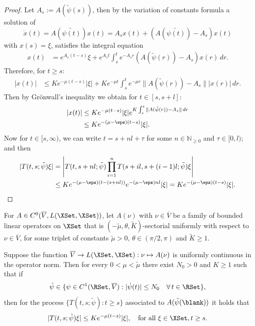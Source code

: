 \documentclass[a4paper]{siamart190516}
\begin{document}
 \begin{proof}
Let $A_s := A(\tilde{\psi}(s))$, then by the variation of constants formula a solution of
\[
\dot{x}(t) = A(\tilde{\psi(t)}) x(t) = A_s x(t) + (A(\tilde{\psi(t)}) - A_s) x(t)
\]
with $x(s) = \xi$, satisfies the integral equation
\begin{align*}
x(t) &= e^{A_s (t-s)} \xi + e^{A_s t} \int_s^t e^{-A_s r} ( A(\tilde{\psi}(r)) - A_s ) x(r) \, dr.
\end{align*}
Therefore, for $t \geq s$:
\begin{align*}
| x(t) | &\leq K e^{-\mu (t-s)} |\xi| + K e^{-\mu t} \int_s^t e^{-\mu r} \| A(\tilde{\psi}(r)) - A_s \| |  x(r) | \, dr.
\end{align*}
Then by Gr\"onwall's inequality we obtain for $t \in [s,s+l]$:
\begin{align*}
| x(t) | &\leq K e^{-\mu (t-s)} |\xi| e^{K \int_s^t \| A(\tilde{\psi}(r)) - A_s \|  \, dr} \\
&\leq K e^{-(\mu - \eps) (t-s) } |\xi|.
\end{align*}
Now for $t \in [s,\infty)$, we can write $t = s + n l + \tau$ for some $n \in \mathbb{N}_{\geq 0}$ and $\tau \in [0,l)$; and then
\begin{align*}
| T(t,s; \tilde{\psi}) \xi | &= \left| T(t, s+ nl; \tilde{\psi}) \prod_{i = 1}^{n} T(s+il, s+(i-1)l; \tilde{\psi}) \xi \right| \\
&\leq K e^{-(\mu - \eps) (t-(s+nl)) } e^{-(\mu - \eps) nl }  |\xi| = K e^{-(\mu - \eps) (t-s)}  |\xi|.
\end{align*}
\end{proof}

\begin{corollary}\label{cor:slow-A-stable}
For $A \in C^0(\overline{V},L(\XSet,\XSet))$, let $A(\nu)$ with $\nu \in \overline{V}$ be a family of bounded linear operators on $\XSet$ 
that is $(-\tilde{\mu},\theta,\tilde{K})$-sectorial uniformly with respect to $\nu \in \overline{V}$, 
for some triplet of constants $\tilde{\mu} > 0, \, \theta \in (\pi/2,\pi)$ and $\tilde{K} \geq 1$.

Suppose the function $\overline{V} \rightarrow L(\XSet,\XSet) : \nu \mapsto A(\nu)$ is uniformly continuous in the operator norm.
Then for every $0 < \mu < \tilde{\mu}$ there exist $N_0 > 0$ and $K \geq 1$ such that if
\[
\tilde{\psi} \in \{\psi \in C^1(\RSet,\overline{V}): | \dot{\psi}(t) | \leq N_0 \quad \forall \, t \in \RSet \},
\]
then for the process $\{ T(t,s; \tilde{\psi}): t \geq s \}$ associated to $A(\tilde{\psi}(\blank))$ it holds that
 \[
 | T(t,s; \tilde{\psi}) \xi | \leq K e^{-\mu (t-s) } |\xi|, \quad \text{for all } \xi \in \XSet, t \geq s.
 \]
\end{corollary} 
\end{document}
